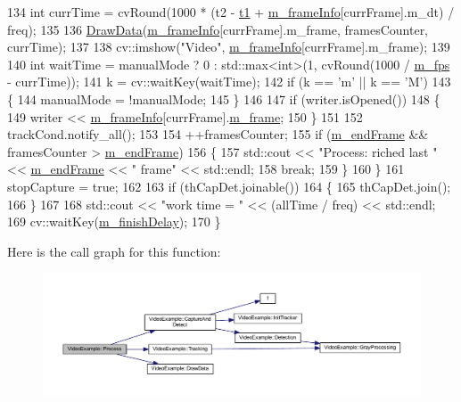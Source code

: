 \begin{DoxyCode}
134         \textcolor{keywordtype}{int} currTime = cvRound(1000 * (t2 - \mbox{\hyperlink{gml2nestedsql_8cpp_a214bd1a0500f5739ce581a8bcffb518a}{t1}} + \mbox{\hyperlink{class_video_example_af5363ad3ed9a34bd105dbdaf274acb66}{m\_frameInfo}}[currFrame].m\_dt) / freq);
135 
136         \mbox{\hyperlink{class_video_example_a53eb15977cb147dac218d8ea337986cd}{DrawData}}(\mbox{\hyperlink{class_video_example_af5363ad3ed9a34bd105dbdaf274acb66}{m\_frameInfo}}[currFrame].m\_frame, framesCounter, currTime);
137 
138         cv::imshow(\textcolor{stringliteral}{"Video"}, \mbox{\hyperlink{class_video_example_af5363ad3ed9a34bd105dbdaf274acb66}{m\_frameInfo}}[currFrame].m\_frame);
139 
140         \textcolor{keywordtype}{int} waitTime = manualMode ? 0 : std::max<int>(1, cvRound(1000 / \mbox{\hyperlink{class_video_example_ae8110012f8d57f39d6355377cf20fb27}{m\_fps}} - currTime));
141         k = cv::waitKey(waitTime);
142         \textcolor{keywordflow}{if} (k == \textcolor{charliteral}{'m'} || k == \textcolor{charliteral}{'M'})
143         \{
144             manualMode = !manualMode;
145         \}
146 
147         \textcolor{keywordflow}{if} (writer.isOpened())
148         \{
149             writer << \mbox{\hyperlink{class_video_example_af5363ad3ed9a34bd105dbdaf274acb66}{m\_frameInfo}}[currFrame].\mbox{\hyperlink{struct_video_example_1_1_frame_info_ace63373cca952f2c7f281b18220f9f8c}{m\_frame}};
150         \}
151 
152         trackCond.notify\_all();
153 
154         ++framesCounter;
155         \textcolor{keywordflow}{if} (\mbox{\hyperlink{class_video_example_ae44e854b8a76b3d4f6393582afd70e67}{m\_endFrame}} && framesCounter > \mbox{\hyperlink{class_video_example_ae44e854b8a76b3d4f6393582afd70e67}{m\_endFrame}})
156         \{
157             std::cout << \textcolor{stringliteral}{"Process: riched last "} << \mbox{\hyperlink{class_video_example_ae44e854b8a76b3d4f6393582afd70e67}{m\_endFrame}} << \textcolor{stringliteral}{" frame"} << std::endl;
158             \textcolor{keywordflow}{break};
159         \}
160     \}
161     stopCapture = \textcolor{keyword}{true};
162 
163     \textcolor{keywordflow}{if} (thCapDet.joinable())
164     \{
165         thCapDet.join();
166     \}
167 
168     std::cout << \textcolor{stringliteral}{"work time = "} << (allTime / freq) << std::endl;
169     cv::waitKey(\mbox{\hyperlink{class_video_example_ac21a646c343edd4c11db034fa2c8c085}{m\_finishDelay}});
170 \}
\end{DoxyCode}
Here is the call graph for this function\+:
\nopagebreak
\begin{figure}[H]
\begin{center}
\leavevmode
\includegraphics[width=350pt]{class_video_example_a87efc66a82c36ad3380623d30a12abf2_cgraph}
\end{center}
\end{figure}
